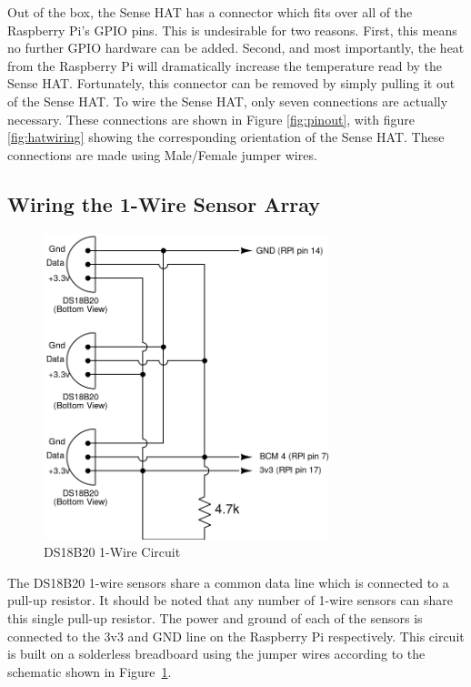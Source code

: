 \documentclass[journal]{new-aiaa}
\begin{document}
Out of the box, the Sense HAT has a connector which fits over all of
the Raspberry Pi's GPIO pins.  This is undesirable for two reasons.
First, this means no further GPIO hardware can be added.  Second, and
most importantly, the heat from the Raspberry Pi will dramatically
increase the temperature read by the Sense HAT.  Fortunately, this
connector can be removed by simply pulling it out of the Sense HAT.
To wire the Sense HAT, only seven connections are actually necessary.
These connections are shown
in Figure \ref{fig:pinout}, with figure \ref{fig:hatwiring} showing
the corresponding orientation of the Sense HAT.  These connections are
made using Male/Female jumper wires.

\subsection{Wiring the 1-Wire Sensor Array}
\begin{figure}
    \centering
    \includegraphics[height=3.5in]{images/ds18b20-circuit}
    \caption{DS18B20 1-Wire Circuit}
    \label{fig:circuit}
\end{figure}
The DS18B20 1-wire sensors share a common data line which is connected
to a pull-up resistor.  It should be noted that any number of 1-wire
sensors can share this single pull-up resistor.  The power and ground
of each of the sensors is connected to the 3v3 and GND line on the Raspberry
Pi respectively.
This circuit is built on a solderless breadboard using the jumper
wires according to the schematic shown in Figure~\ref{fig:circuit}. 
\end{document}
